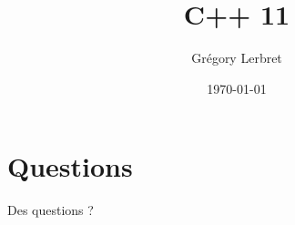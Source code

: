 \documentclass[t, 10pt]{beamer}
\author{Grégory Lerbret}
\title{C++ 11}
\date{\today}
\begin{document}
\frame[plain]{\maketitle}



\section*{Questions}
\begin{frame}[c]
	\begin{center}
		\huge Des questions ?
	\end{center}
\end{frame}


\end{document}
